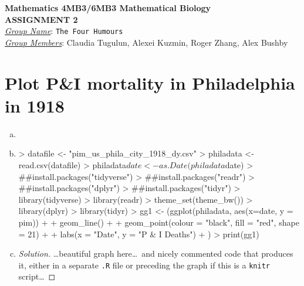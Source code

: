 \documentclass[12pt]{article}
\begin{document}
\begin{center}
{\bf Mathematics 4MB3/6MB3 Mathematical Biology\\
 ASSIGNMENT 2}\\
\medskip
\underline{\emph{Group Name}}: \texttt{{\color{blue}The Four Humours}}\\
\medskip
\underline{\emph{Group Members}}: {\color{blue}Claudia Tugulun, Alexei Kuzmin, Roger Zhang, Alex Bushby}
\end{center}

\section{Plot P\&I mortality in Philadelphia in 1918}

\begin{enumerate}[(a)]

\item \PhilaDataReceived

\item \PhilaDataReadA

\begin{Schunk}
\begin{Sinput}
> datafile <- "pim_us_phila_city_1918_dy.csv"
> philadata <- read.csv(datafile)
> philadata$date <- as.Date(philadata$date)
> ##install.packages("tidyverse")
> ##install.packages("readr")
> ##install.packages("dplyr")
> ##install.packages("tidyr")
> library(tidyverse)
> library(readr)
> theme_set(theme_bw())
> library(dplyr)
> library(tidyr)
> gg1 <- (ggplot(philadata, aes(x=date, y = pim)) + 
+          geom_line() + 
+          geom_point(colour = "black", fill = "red", shape = 21) + 
+          labs(x = "Date", y = "P & I Deaths")
+ )
> print(gg1)
\end{Sinput}
\end{Schunk}


\PhilaDataReadB

\item \PhilaDataReproduceA

  {\color{blue} \begin{proof}[Solution]
  {\color{magenta}\dots beautiful graph here\dots\ and nicely commented code that produces it, either in a separate \texttt{.R} file or preceding the graph if this is a \texttt{knitr} script\dots}
  \end{proof}
  }
  

\end{enumerate}
\end{document}
